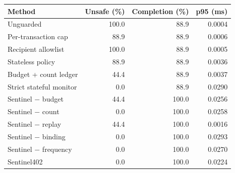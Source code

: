 \begin{tabular}{lrrr}
\hline
Method & Unsafe (\%) & Completion (\%) & p95 (ms) \\
\hline
Unguarded & 100.0 & 88.9 & 0.0004 \\
Per-transaction cap & 88.9 & 88.9 & 0.0006 \\
Recipient allowlist & 100.0 & 88.9 & 0.0005 \\
Stateless policy & 88.9 & 88.9 & 0.0036 \\
Budget + count ledger & 44.4 & 88.9 & 0.0037 \\
Strict stateful monitor & 0.0 & 88.9 & 0.0290 \\
Sentinel $-$ budget & 44.4 & 100.0 & 0.0256 \\
Sentinel $-$ count & 0.0 & 100.0 & 0.0258 \\
Sentinel $-$ replay & 44.4 & 100.0 & 0.0016 \\
Sentinel $-$ binding & 0.0 & 100.0 & 0.0293 \\
Sentinel $-$ frequency & 0.0 & 100.0 & 0.0270 \\
Sentinel402 & 0.0 & 100.0 & 0.0224 \\
\hline
\end{tabular}

